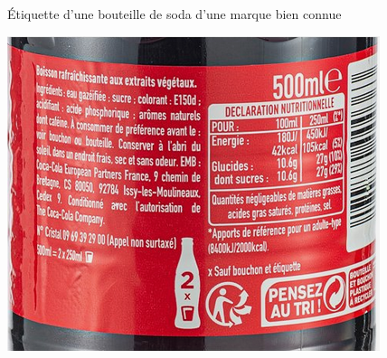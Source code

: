 \begin{doc}{\'{E}tiquette d'une bouteille de soda d'une marque bien connue}
\vspace{-0.4cm}
  \label{doc:Coca}
  \begin{center}
     \includegraphics[scale=2]{Images/TP/TP6/Etiquette_coca.png}
  \end{center}
\end{doc}
 
\newpage

